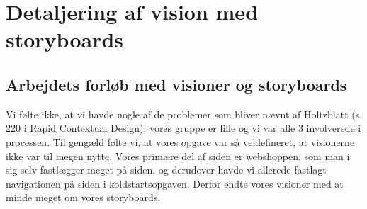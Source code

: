 \section{Detaljering af vision med storyboards}


\subsection{Arbejdets forløb med visioner og storyboards}
Vi følte ikke, at vi havde nogle af de problemer som bliver nævnt af Holtzblatt (s. 220 i Rapid Contextual Design):
vores gruppe er lille og vi var alle 3 involverede i processen. Til gengæld følte vi, at vores opgave var så veldefineret,
at visionerne ikke var til megen nytte. Vores primære del af siden er webshoppen, som man i sig selv fastlægger meget på siden,
og derudover havde vi allerede fastlagt navigationen på siden i koldstartsopgaven. Derfor endte vores visioner med at minde meget
om vores storyboards.


